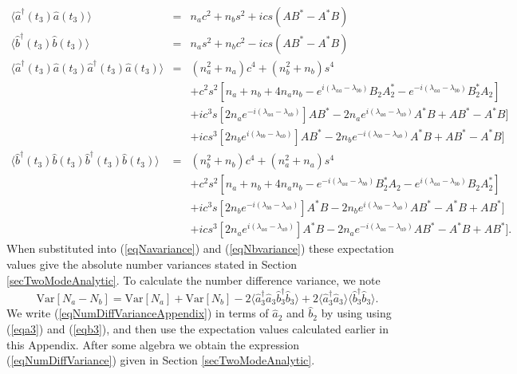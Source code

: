 \documentclass{iopart}
\begin{document}
\begin{eqnarray}
\langle \hat{a}^{\dagger}(t_3) \hat{a}(t_3) \rangle &=& n_a c^2 + n_b s^2 + i c s (A B^* - A^* B) \\
%
\langle \hat{b}^{\dagger}(t_3) \hat{b}(t_3) \rangle &=& n_a s^2 + n_b c^2 - i c s (A B^* - A^* B) \\
%
\langle \hat{a}^{\dagger}(t_3) \hat{a}(t_3) \hat{a}^{\dagger}(t_3)  \hat{a}(t_3) \rangle &=& (n_a^2 + n_a) c^4 + (n_b^2 + n_b) s^4 \nonumber \\
&& + c^2 s^2 [n_a +n_b +4 n_a n_b - e^{i(\lambda_{aa}-\lambda_{bb})} B_2 A_2^* - e^{-i(\lambda_{aa}-\lambda_{bb})} B_2^* A_2] \nonumber \\
&& + i c^3 s [2 n_a e^{-i(\lambda_{aa}-\lambda_{ab})}] A B^* - 2 n_a e^{i(\lambda_{aa}-\lambda_{ab})} A^* B + A B^* - A^* B] \nonumber \\
&& + i c s^3 [2 n_b e^{i(\lambda_{bb}-\lambda_{ab})}] A B^* - 2 n_b e^{-i(\lambda_{bb}-\lambda_{ab})} A^* B + A B^* - A^* B] \\
%
\langle \hat{b}^{\dagger}(t_3)  \hat{b}(t_3) \hat{b}^{\dagger}(t_3)  \hat{b}(t_3) \rangle &=& (n_b^2 + n_b) c^4 + (n_a^2 + n_a) s^4 \nonumber \\
&& + c^2 s^2 [n_a +n_b +4 n_a n_b - e^{-i(\lambda_{aa}-\lambda_{bb})} B_2^* A_2 - e^{i(\lambda_{aa}-\lambda_{bb})} B_2 A_2^*] \nonumber \\
&& + i c^3 s [2 n_b e^{-i(\lambda_{bb}-\lambda_{ab})}] A^* B - 2 n_b e^{i(\lambda_{bb}-\lambda_{ab})} A B^* - A^* B + A B^*] \nonumber \\
&& + i c s^3 [2 n_a e^{i(\lambda_{aa}-\lambda_{ab})}] A^* B - 2 n_a e^{-i(\lambda_{aa}-\lambda_{ab})} A B^* - A^* B + A B^*]. 
\end{eqnarray}
When substituted into (\ref{eqNavariance}) and (\ref{eqNbvariance}) these expectation values give the absolute number variances stated in Section \ref{secTwoModeAnalytic}. To calculate the number difference variance, we note
\begin{equation}
{\mathrm{Var}}[N_a-N_b] = {\mathrm{Var}}[N_a] + {\mathrm{Var}}[N_b] - 2\langle \hat{a}^{\dagger}_3 \hat{a}_3 \hat{b}^{\dagger}_3 \hat{b}_3\rangle + 2\langle \hat{a}^{\dagger}_3  \hat{a}_3 \rangle \langle \hat{b}^{\dagger}_3 \hat{b}_3\rangle \label{eqNumDiffVarianceAppendix}.
\end{equation}
We write (\ref{eqNumDiffVarianceAppendix}) in terms of $\hat{a}_2$ and $\hat{b}_2$ by using using (\ref{eqa3}) and (\ref{eqb3}), and then use the expectation values calculated earlier in this Appendix. After some algebra we obtain the expression (\ref{eqNumDiffVariance}) given in Section \ref{secTwoModeAnalytic}.
\end{document}
